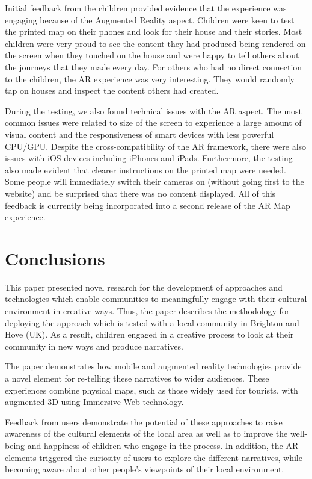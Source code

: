 \documentclass{egpubl}
\begin{document}
Initial feedback from the children provided evidence that the experience was
engaging because of the Augmented Reality aspect. Children were keen to test
the printed map on their phones and look for their house and their stories.
Most children were very proud to see the content they had produced being
rendered on the screen when they touched on the house and were happy to tell
others about the journeys that they made every day. For others who had no
direct connection to the children, the AR experience was very interesting.
They would randomly tap on houses and inspect the content others had created.
 
 During the testing, we also found technical issues with the AR aspect. The
 most common issues were related to size of the screen to experience a large
 amount of visual content and the responsiveness of smart devices with less
 powerful CPU/GPU. Despite the cross-compatibility of the AR framework, there
 were also issues with iOS devices including iPhones and iPads. Furthermore,
 the testing also made evident that clearer instructions on the printed map
 were needed. Some people will immediately switch their cameras on (without
 going first to the website) and be surprised that there was no content
 displayed.  All of this feedback is currently being incorporated into a
 second release of the AR Map experience. 


\section{Conclusions} \label{conc} This paper presented novel research for the
development of approaches and technologies which enable communities to
meaningfully engage with their cultural environment in creative ways. Thus,
the paper describes the methodology for deploying the approach which is tested
with a local community in Brighton and Hove (UK). As a result, children
engaged in a creative process to look at their community in new ways and
produce narratives.

The paper demonstrates how mobile and augmented reality technologies provide a
novel element for re-telling these narratives to wider audiences. These
experiences combine physical maps, such as those widely used for tourists,
with augmented 3D using Immersive Web technology. 

Feedback from users demonstrate the potential of these approaches to raise
awareness of the cultural elements of the local area as well as to improve the
well-being and happiness of children who engage in the process. In addition,
the AR elements triggered the curiosity of users to explore the different
narratives, while becoming aware about other people's viewpoints of their local
environment.
\end{document}
